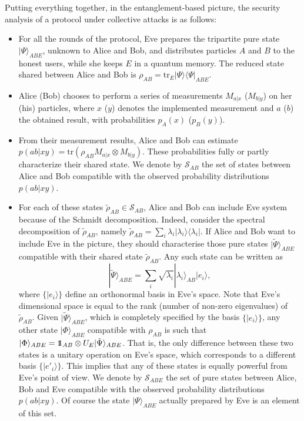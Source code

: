 \documentclass[a4paper]{article}
\def\tr{\mbox{tr}}
\def\one{\leavevmode\hbox{\small1\normalsize\kern-.33em1}}
\def\bra#1{\langle#1|} \def\ket#1{|#1\rangle}
\def\proj#1{\ket{#1}\!\bra{#1}}
\begin{document}
Putting everything together, in the entanglement-based picture, the security analysis of a protocol under collective attacks is as follows:
\begin{itemize}
    \item For all the rounds of the protocol, Eve prepares the tripartite pure state $\ket{\Psi}_{ABE}$, unknown to Alice and Bob, and distributes particles $A$ and $B$ to the honest users, while she keeps $E$ in a quantum memory. The reduced state shared between Alice and Bob is $\rho_{AB}=\tr_E\proj{\Psi}_{ABE}$.
    \item Alice (Bob) chooses to perform a series of measurements  $M_{a|x}$ ($M_{b|y}$)
    on her (his) particles, where $x$ ($y$) denotes the implemented measurement and $a$ ($b$) the obtained result, with probabilities $p_A(x)$ ($p_B(y)$).
    \item From their measurement results, Alice and Bob can estimate $p(ab|xy)=\tr(\rho_{AB}M_{a|x}\otimes M_{b|y})$. These probabilities fully or partly characterize their shared state. We denote by $\mathcal{S}_{AB}$ the set of states between Alice and Bob compatible with the observed probability distributions $p(ab|xy)$. 
    \item For each of these states $\tilde\rho_{AB}\in\mathcal S_{AB}$, Alice and Bob can include Eve
system because of the Schmidt
decomposition. Indeed, consider the spectral decomposition of
$\tilde\rho_{AB}$, namely $\tilde\rho_{AB}=\sum_i\lambda_i\proj{\lambda_i}$.
If Alice and Bob want to include Eve in the picture, they should
characterise those pure states $\ket{\tilde\Psi}_{ABE}$ compatible with their shared state $\tilde\rho_{AB}$. Any such state can be written as
\begin{equation}\label{psiabe}
    \ket{\tilde\Psi}_{ABE}=\sum_i
    \sqrt{\lambda_i}\ket{\lambda_i}_{AB}\ket{e_i} ,
\end{equation}
where $\{\ket{e_i}\}$ define an orthonormal basis in Eve's space.
Note that Eve's dimensional space is equal to the rank (number of
non-zero eigenvalues) of $\tilde\rho_{AB}$. Given
$\ket{\tilde\Psi}_{ABE}$, which is completely specified by the basis
$\{\ket{e_i}\}$, any other state $\ket{\Phi}_{ABE}$ compatible with $\rho_{AB}$
is such that
$\ket{\Phi}_{ABE}=\one_{AB}\otimes U_E\ket{\tilde\Psi}_{ABE}$. That is,
the only difference between these two states is a unitary
operation on Eve's space, which corresponds to a different basis
$\{\ket{e'_i}\}$. This implies that any of these states is equally
powerful from Eve's point of view. We denote by $\mathcal{S}_{ABE}$ the set of pure states between Alice, Bob and Eve compatible with the observed probability distributions $p(ab|xy)$. Of course the state $\ket{\Psi}_{ABE}$ actually prepared by Eve is an element of this set.

\end{itemize}
\end{document}
